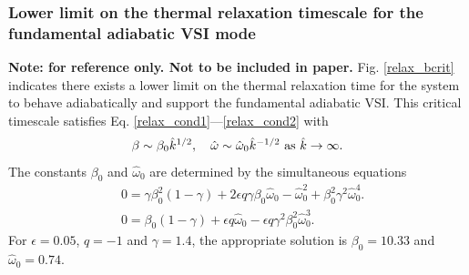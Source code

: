 \subsubsection{Lower limit on the thermal relaxation timescale for the
  fundamental adiabatic VSI mode}
{\bf Note: for reference only. Not to be included in paper.} 
Fig. \ref{relax_bcrit} indicates there exists a lower limit on the
thermal relaxation time for the system to behave adiabatically and
support the fundamental adiabatic VSI. This critical
timescale satisfies Eq. \ref{relax_cond1}---\ref{relax_cond2} with 
\begin{align}
  \beta \sim \beta_0\hat{k}^{1/2},\quad \hat{\omega}  \sim
  \hat{\omega}_0\hat{k}^{-1/2} \text{ as } \hat{k}\to\infty.
\end{align}
The constants $\beta_0$ and $\hat{\omega}_0$ are determined by the
simultaneous equations
\begin{align}
  & 0 = \gamma\beta_0^2(1-\gamma) + 2\epsilon q \gamma
  \beta_0\hat{\omega}_0 - \hat{\omega}_0^2 +
  \beta_0^2\gamma^2\hat{\omega}_0^4.\\
  & 0= \beta_0(1-\gamma) + \epsilon q \hat{\omega}_0 - \epsilon q
  \gamma^2 \beta_0^2\hat{\omega}_0^3. 
\end{align}
For $\epsilon = 0.05$, $q=-1$ and $\gamma=1.4$, the appropriate
solution is $\beta_0 = 10.33$ and $\hat{\omega}_0 = 0.74$.  



